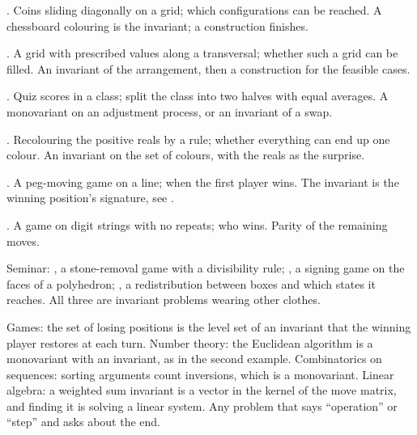 \begin{ladder}
\item {}. Coins sliding diagonally on a grid; which configurations can be reached. A chessboard colouring is the invariant; a construction finishes.
\item {}. A grid with prescribed values along a transversal; whether such a grid can be filled. An invariant of the arrangement, then a construction for the feasible cases.
\item {}. Quiz scores in a class; split the class into two halves with equal averages. A monovariant on an adjustment process, or an invariant of a swap.
\item {}. Recolouring the positive reals by a rule; whether everything can end up one colour. An invariant on the set of colours, with the reals as the surprise.
\item {}. A peg-moving game on a line; when the first player wins. The invariant is the winning position's signature, see .
\item {}. A game on digit strings with no repeats; who wins. Parity of the remaining moves.
\end{ladder}

Seminar: , a stone-removal game with a divisibility rule; , a signing game on the faces of a polyhedron; , a redistribution between boxes and which states it reaches. All three are invariant problems wearing other clothes.

\begin{hides}
Games: the set of losing positions is the level set of an invariant that the winning player restores at each turn. Number theory: the Euclidean algorithm is a monovariant with an invariant, as in the second example. Combinatorics on sequences: sorting arguments count inversions, which is a monovariant. Linear algebra: a weighted sum invariant is a vector in the kernel of the move matrix, and finding it is solving a linear system. Any problem that says ``operation'' or ``step'' and asks about the end.
\end{hides}

